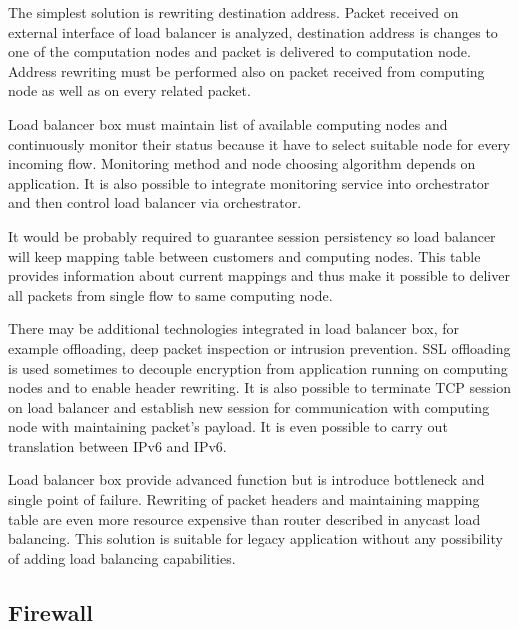 The simplest solution is rewriting destination address. Packet received on external interface of load balancer is analyzed, destination address is changes to one of the computation nodes and packet is delivered to computation node. Address rewriting must be performed also on packet received from computing node as well as on every related packet. 

Load balancer box must maintain list of available computing nodes and continuously monitor their status because it have to select suitable node for every incoming flow. Monitoring method and node choosing algorithm depends on application. It is also possible to integrate monitoring service into orchestrator and then control load balancer via orchestrator.

It would be probably required to guarantee session persistency so load balancer will keep mapping table between customers and computing nodes. This table provides information about current mappings and thus make it possible to deliver all packets from single flow to same computing node.

There may be additional technologies integrated in load balancer box, for example offloading, deep packet inspection or intrusion prevention. \Ac{SSL} offloading is used sometimes to decouple encryption from application running on computing nodes and to enable header rewriting. It is also possible to terminate \Ac{TCP} session on load balancer and establish new session for communication with computing node with maintaining packet's payload. It is even possible to carry out translation between \Ac{IPv6} and \Ac{IPv6}.

Load balancer box provide advanced function but is introduce bottleneck and single point of failure. Rewriting of packet headers and maintaining mapping table are even more resource expensive than router described in anycast load balancing. This solution is suitable for legacy application without any possibility of adding load balancing capabilities. 

\subsection{Firewall}


